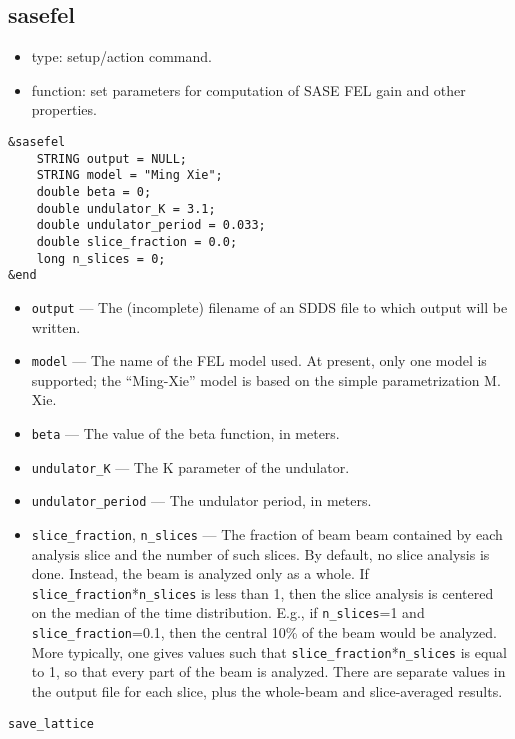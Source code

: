 \documentclass[11pt]{article}
\begin{document}
\subsection{sasefel}

\begin{itemize}
\item type: setup/action command.
\item function: set parameters for computation of SASE FEL gain and other properties.
\end{itemize}

\begin{verbatim}
&sasefel
    STRING output = NULL;
    STRING model = "Ming Xie";
    double beta = 0;
    double undulator_K = 3.1;
    double undulator_period = 0.033;
    double slice_fraction = 0.0;
    long n_slices = 0;
&end
\end{verbatim}

\begin{itemize}
\item \verb|output| --- The (incomplete) filename of an SDDS file to which output will be
written.
\item \verb|model| --- The name of the FEL model used.  At present, only one model is
supported; the ``Ming-Xie'' model is based on the simple parametrization M. Xie\cite{MingXie}.
\item \verb|beta| --- The value of the beta function, in meters.
\item \verb|undulator_K| --- The K parameter of the undulator.
\item \verb|undulator_period| --- The undulator period, in meters.
\item \verb|slice_fraction|, \verb|n_slices| --- The fraction of beam beam contained by each analysis slice
        and the number of such slices.
        By default, no slice analysis is done.  Instead, the beam is analyzed only as a whole.
        If \verb|slice_fraction|*\verb|n_slices| is less than 1, then the slice analysis
        is centered on the median of the time distribution.  E.g., if \verb|n_slices|=1 and
        \verb|slice_fraction|=0.1, then the central 10\% of the beam would be analyzed.
        More typically, one gives values such that \verb|slice_fraction|*\verb|n_slices| is
        equal to 1, so that every part of the beam is analyzed.  There are separate values in
        the output file for each slice, plus the whole-beam and slice-averaged results.
\end{itemize}

\begin{latexonly}
\newpage
\begin{center}{\Large\verb|save_lattice|}\end{center}
\end{latexonly}
\end{document}
